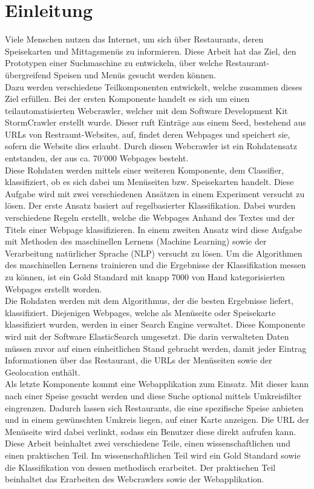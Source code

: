 \chapter{Einleitung}
Viele Menschen nutzen das Internet, um sich über Restaurants, deren Speisekarten und Mittagsmenüs zu informieren.
Diese Arbeit hat das Ziel, den Prototypen einer Suchmaschine zu entwickeln, über welche Restaurant-übergreifend Speisen und Menüs gesucht werden können.\\
Dazu werden verschiedene Teilkomponenten entwickelt, welche zusammen dieses Ziel erfüllen.
Bei der ersten Komponente handelt es sich um einen teilautomatisierten Webcrawler, welcher mit dem Software Development Kit \glqq StormCrawler\grqq{} erstellt wurde.
Dieser ruft Einträge aus einem Seed, bestehend aus URLs von Restraunt-Websites, auf, findet deren Webpages  und speichert sie, sofern die Website dies erlaubt.
Durch diesen Webcrawler ist ein Rohdatensatz entstanden, der aus ca. 70'000 Webpages besteht.\\
Diese Rohdaten werden mittels einer weiteren Komponente, dem Classifier, klassifiziert, ob es sich dabei um Menüseiten bzw. Speisekarten handelt.
Diese Aufgabe wird mit zwei verschiedenen Ansätzen in einem Experiment versucht zu lösen.
Der erste Ansatz basiert auf regelbasierter Klassifikation.
Dabei wurden verschiedene Regeln erstellt, welche die Webpages Anhand des Textes und der Titels einer Webpage klassifizieren.
In einem zweiten Ansatz wird diese Aufgabe mit Methoden des maschinellen Lernens (Machine Learning) sowie der Verarbeitung natürlicher Sprache (NLP) versucht zu lösen.
Um die Algorithmen des maschinellen Lernens trainieren und die Ergebnisse der Klassifikation messen zu können, ist ein Gold Standard mit knapp 7000 von Hand kategorisierten Webpages erstellt worden.\\
Die Rohdaten werden mit dem Algorithmus, der die besten Ergebnisse liefert, klassifiziert.
Diejenigen Webpages, welche als Menüseite oder Speisekarte klassifiziert wurden, werden in einer Search Engine verwaltet.
Diese Komponente wird mit der Software ElasticSearch umgesetzt.
Die darin verwalteten Daten müssen zuvor auf einen einheitlichen Stand gebracht werden, damit jeder Eintrag Informationen über das Restaurant, die URLs der Menüseiten sowie der Geolocation enthält.\\
Als letzte Komponente kommt eine Webapplikation zum Einsatz. 
Mit dieser kann nach einer Speise gesucht werden und diese Suche optional mittels Umkreisfilter eingrenzen.
Dadurch lassen sich Restaurants, die eine spezifische Speise anbieten und in einem gewünschten Umkreis liegen, auf einer Karte anzeigen.
Die URL der Menüseite wird dabei verlinkt, sodass ein Benutzer diese direkt aufrufen kann.\\
Diese Arbeit beinhaltet zwei verschiedene Teile, einen wissenschaftlichen und einen praktischen Teil.
Im wissenschaftlichen Teil wird ein Gold Standard sowie die Klassifikation von dessen methodisch erarbeitet.
Der praktischen Teil beinhaltet das Erarbeiten des Webcrawlers sowie der Webapplikation.